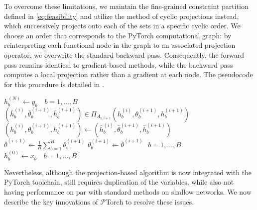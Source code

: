 \documentclass{article}
\let\Cref\crtCref
\let\cref\crtcref
\begin{document}
To overcome these limitations, we maintain the fine-grained constraint partition defined in \eqref{eq:feasibility} and utilize the method of cyclic projections instead, which successively projects onto each of the sets in a specific cyclic order. We choose an order that corresponds to the PyTorch computational graph: by reinterpreting each functional node in the graph to an associated projection operator, we overwrite the standard backward pass. Consequently, the forward pass remains identical to gradient-based methods, while the backward pass computes a local projection rather than a gradient at each node. The pseudocode for this procedure is detailed in \cref{alg:cyclic}.
\begin{algorithm}
\caption{Cyclic projections method on the PyTorch computational graph.}\label{alg:cyclic}
\begin{algorithmic}[1]
\State $h^{(N)}_b \gets y_b \quad b=1,\ldots, B$  
        \State $(\bar h^{(i)}_b, \bar \theta^{(i+1)}_b, \bar h^{(i+1)}_b) \in \Pi_{A_{b,i+1}}(h^{(i)}_b, \theta^{(i+1)}_b, h^{(i+1)}_b)$  
        \State $(h^{(i)}_b, \theta^{(i+1)}_b, h^{(i+1)}_b) \gets (\bar h^{(i)}_b, \bar \theta^{(i+1)}_b, \bar h^{(i+1)}_b)$ 
    \EndFor
    \State $\bar \theta^{(i+1)} \gets \frac{1}{B}\sum_{b=1}^B \theta_{b}^{(i+1)}$
    \State $\theta^{(i+1)}_b \gets \bar \theta^{(i+1) \quad} b=1,\ldots, B$   
\EndFor
\State $h^{(0)}_b \gets x_b \quad b=1,\ldots,B$ 
\end{algorithmic}
\end{algorithm}

Nevertheless, although the projection-based algorithm is now integrated with the PyTorch toolchain, \Cref{alg:cyclic} still requires duplication of the variables, while also not having performance on par with standard methods on shallow networks. We now describe the key innovations of $\mathcal{P}$Torch to resolve these issues.

\end{document}
